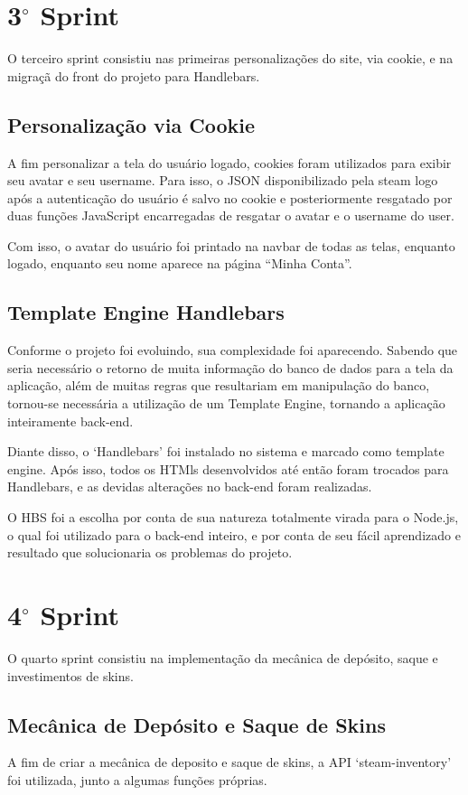 \section{3$^{\circ}$ Sprint}
O terceiro sprint consistiu nas primeiras personalizações do site, via cookie, e na migraçã do front do projeto para Handlebars.

\subsection{Personalização via Cookie}
A fim personalizar a tela do usuário logado, cookies foram utilizados para 
exibir seu avatar e seu username. Para isso, o JSON disponibilizado pela steam logo 
após a autenticação do usuário é salvo no cookie e posteriormente resgatado por duas 
funções JavaScript encarregadas de resgatar o avatar e o username do user.

Com isso, o avatar do usuário foi printado na navbar de todas as telas, enquanto logado, enquanto seu nome 
aparece na página ``Minha Conta''.

\subsection{Template Engine Handlebars}
Conforme o projeto foi evoluindo, sua complexidade foi aparecendo. Sabendo que seria necessário o retorno 
de muita informação do banco de dados para a tela da aplicação, além de muitas regras que resultariam 
em manipulação do banco, tornou-se necessária a utilização de um Template Engine, tornando a aplicação 
inteiramente back-end. 

Diante disso, o ‘Handlebars’ foi instalado no sistema e marcado como template engine. Após isso, todos 
os HTMls desenvolvidos até então foram trocados para Handlebars, e as devidas alterações no back-end 
foram realizadas.

O HBS foi a escolha por conta de sua natureza totalmente virada para o Node.js, o qual foi utilizado 
para o back-end inteiro, e por conta de seu fácil aprendizado e resultado que solucionaria os 
problemas do projeto.

\section{4$^{\circ}$ Sprint}
O quarto sprint consistiu na implementação da mecânica de depósito, saque e investimentos de skins.

\subsection{Mecânica de Depósito e Saque de Skins}
A fim de criar a mecânica de deposito e saque de skins, a API ‘steam-inventory’ foi utilizada, 
junto a algumas funções próprias.


